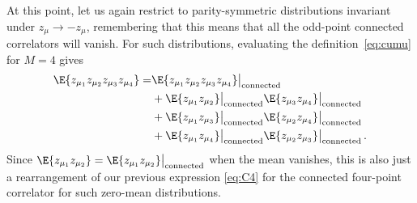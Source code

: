 At this point, let us again restrict to parity-symmetric distributions invariant under $z_\mu \to - z_\mu$, remembering that this means that all the odd-point connected correlators will vanish. For such distributions, evaluating the definition~\eqref{eq:cumu} for $M=4$ gives
\begin{align}\label{eq:C4-reversed}
\E{z_{\mu_1} z_{\mu_2}z_{\mu_3}z_{\mu_4}}=&\E{z_{\mu_1} z_{\mu_2}z_{\mu_3}z_{\mu_4}}\big|_{\text{connected}}\, \\
&+\E{z_{\mu_1} z_{\mu_2}}\big|_{\text{connected}}\E{z_{\mu_3} z_{\mu_4}}\big|_{\text{connected}}\, \nonumber\\
&+\E{z_{\mu_1} z_{\mu_3}}\big|_{\text{connected}}\E{z_{\mu_2} z_{\mu_4}}\big|_{\text{connected}}\, \nonumber\\
&+\E{z_{\mu_1} z_{\mu_4}}\big|_{\text{connected}}\E{z_{\mu_2} z_{\mu_3}}\big|_{\text{connected}}\, .\nonumber
\end{align}
Since $\E{z_{\mu_1} z_{\mu_2}}=\E{z_{\mu_1} z_{\mu_2}}\big|_{\text{connected}}$ when the mean vanishes, this is also just a rearrangement of our previous expression \eqref{eq:C4} for the connected four-point correlator for such zero-mean distributions. 

